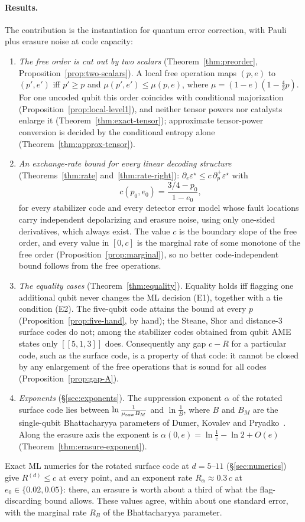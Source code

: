 \documentclass[11pt,a4paper]{article}
\theoremstyle{plain}
\theoremstyle{definition}
\theoremstyle{remark}
\newcommand{\err}{\varepsilon^{\star}}
\begin{document}
\paragraph{Results.}
The contribution is the instantiation for quantum error correction, with Pauli plus erasure noise at code capacity:
\begin{enumerate}[label=(\roman*),leftmargin=2em]
\item \emph{The free order is cut out by two scalars} (Theorem~\ref{thm:preorder}, Proposition~\ref{prop:two-scalars}). A local free operation maps $(p,e)$ to $(p',e')$ iff $p'\ge p$ and $\mu(p',e')\le\mu(p,e)$, where $\mu=(1-e)(1-\tfrac43p)$. For one uncoded qubit this order coincides with conditional majorization (Proposition~\ref{prop:local-level1}), and neither tensor powers nor catalysts enlarge it (Theorem~\ref{thm:exact-tensor}); approximate tensor-power conversion is decided by the conditional entropy alone (Theorem~\ref{thm:approx-tensor}).
\item \emph{An exchange-rate bound for every linear decoding structure} (Theorems~\ref{thm:rate} and~\ref{thm:rate-right}): $\partial_e\err\le c\,\partial_p^+\err$ with
\[
c(p_0,e_0)=\frac{3/4-p_0}{1-e_0},
\]
for every stabilizer code and every detector error model whose fault locations carry independent depolarizing and erasure noise, using only one-sided derivatives, which always exist. The value $c$ is the boundary slope of the free order, and every value in $[0,c]$ is the marginal rate of some monotone of the free order (Proposition~\ref{prop:marginal}), so no better code-independent bound follows from the free operations.
\item \emph{The equality cases} (Theorem~\ref{thm:equality}). Equality holds iff flagging one additional qubit never changes the ML decision (E1), together with a tie condition (E2). The five-qubit code attains the bound at every $p$ (Proposition~\ref{prop:five-hand}, by hand); the Steane, Shor and distance-3 surface codes do not; among the stabilizer codes obtained from qubit AME states only $[[5,1,3]]$ does. Consequently any gap $c-R$ for a particular code, such as the surface code, is a property of that code: it cannot be closed by any enlargement of the free operations that is sound for all codes (Proposition~\ref{prop:gap-A}).
\item \emph{Exponents} (\S\ref{sec:exponents}). The suppression exponent $\alpha$ of the rotated surface code lies between $\ln\frac1{\mu_{\rm saw}B_M}$ and $\ln\frac1B$, where $B$ and $B_M$ are the single-qubit Bhattacharyya parameters of Dumer, Kovalev and Pryadko~\cite{DKP}. Along the erasure axis the exponent is $\alpha(0,e)=\ln\frac1e-\ln2+O(e)$ (Theorem~\ref{thm:erasure-exponent}).
\end{enumerate}
Exact ML numerics for the rotated surface code at $d=5$--$11$ (\S\ref{sec:numerics}) give $R^{(d)}\le c$ at every point, and an exponent rate $R_\alpha\approx0.3\,c$ at $e_0\in\{0.02,0.05\}$: there, an erasure is worth about a third of what the flag-discarding bound allows. These values agree, within about one standard error, with the marginal rate $R_B$ of the Bhattacharyya parameter.
\end{document}
